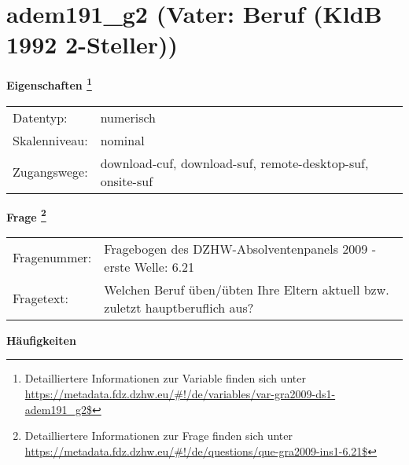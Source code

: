 
    \setcounter{footnote}{0}

    \vspace*{-1.8cm}
	\section{adem191\_g2 (Vater: Beruf (KldB 1992 2-Steller))}
	\label{section:adem191_g2}



    \vspace*{0.5cm}
    \noindent\textbf{Eigenschaften
	\footnote{Detailliertere Informationen zur Variable finden sich unter
		\url{https://metadata.fdz.dzhw.eu/\#!/de/variables/var-gra2009-ds1-adem191_g2$}}}\\
	\begin{tabularx}{\hsize}{@{}lX}
	Datentyp: & numerisch \\
	Skalenniveau: & nominal \\
	Zugangswege: &
	  download-cuf, 
	  download-suf, 
	  remote-desktop-suf, 
	  onsite-suf
 \\
    \end{tabularx}



				\vspace*{0.5cm}
                \noindent\textbf{Frage
	                \footnote{Detailliertere Informationen zur Frage finden sich unter
		              \url{https://metadata.fdz.dzhw.eu/\#!/de/questions/que-gra2009-ins1-6.21$}}}\\
				\begin{tabularx}{\hsize}{@{}lX}
					Fragenummer: &
					  Fragebogen des DZHW-Absolventenpanels 2009 - erste Welle:
					  6.21
 \\
					Fragetext: & Welchen Beruf üben/übten Ihre Eltern aktuell bzw. zuletzt hauptberuflich aus? \\
				\end{tabularx}





        		\vspace*{0.5cm}
                \noindent\textbf{Häufigkeiten}

